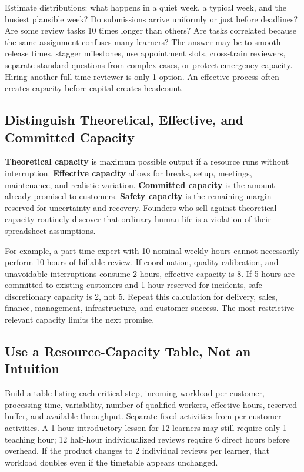 Estimate distributions: what happens in a quiet week, a typical week, and the busiest plausible week? Do submissions arrive uniformly or just before deadlines? Are some review tasks 10 times longer than others? Are tasks correlated because the same assignment confuses many learners? The answer may be to smooth release times, stagger milestones, use appointment slots, cross-train reviewers, separate standard questions from complex cases, or protect emergency capacity. Hiring another full-time reviewer is only 1 option. An effective process often creates capacity before capital creates headcount.

\subsection{Distinguish Theoretical, Effective, and Committed Capacity}
\label{sec:distinguish_capacity_types}

\textbf{Theoretical capacity} is maximum possible output if a resource runs without interruption. \textbf{Effective capacity} allows for breaks, setup, meetings, maintenance, and realistic variation. \textbf{Committed capacity} is the amount already promised to customers. \textbf{Safety capacity} is the remaining margin reserved for uncertainty and recovery. Founders who sell against theoretical capacity routinely discover that ordinary human life is a violation of their spreadsheet assumptions.

For example, a part-time expert with 10 nominal weekly hours cannot necessarily perform 10 hours of billable review. If coordination, quality calibration, and unavoidable interruptions consume 2 hours, effective capacity is 8. If 5 hours are committed to existing customers and 1 hour reserved for incidents, safe discretionary capacity is 2, not 5. Repeat this calculation for delivery, sales, finance, management, infrastructure, and customer success. The most restrictive relevant capacity limits the next promise.

\subsection{Use a Resource-Capacity Table, Not an Intuition}
\label{sec:resource_capacity_table}

Build a table listing each critical step, incoming workload per customer, processing time, variability, number of qualified workers, effective hours, reserved buffer, and available throughput. Separate fixed activities from per-customer activities. A 1-hour introductory lesson for 12 learners may still require only 1 teaching hour; 12 half-hour individualized reviews require 6 direct hours before overhead. If the product changes to 2 individual reviews per learner, that workload doubles even if the timetable appears unchanged.

